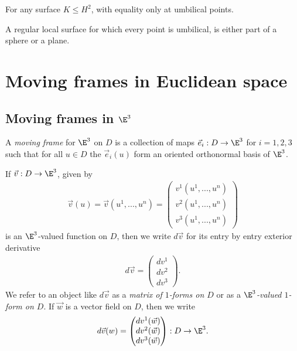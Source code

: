 \documentclass{article}
\begin{document}
\begin{lemma}
    For any surface $K\leq H^2$, with equality only at umbilical points.
\end{lemma}

\begin{theorem}
    A regular local surface for which every point is umbilical, is either part of a sphere 
    or a plane.
\end{theorem}

\section{Moving frames in Euclidean space}

\subsection{Moving frames in $\E^3$}

\begin{definition}
    A \emph{moving frame} for $\E^3$ on $D$ is a collection of maps $\vec e_i:D\to\E^3$
    for $i=1,2,3$ such that for all $u\in D$ the $\vec e_i(u)$ form an oriented orthonormal
    basis of $\E^3$.
\end{definition}

\begin{definition}
    If $\vec v:D\to\E^3$, given by 
    \begin{align*}
        \vec v(u)=\vec v(u^1,...,u^n)=\begin{pmatrix}
            v^1(u^1,...,u^n)\\ 
            v^2(u^1,...,u^n)\\
            v^3(u^1,...,u^n)
        \end{pmatrix}
    \end{align*}
    is an $\E^3$-valued function on $D$, then we write $d\vec v$ for its entry
    by entry exterior derivative 
    \begin{align*}
        d\vec v = \begin{pmatrix}
            dv^1 \\ dv^2 \\ dv^3
        \end{pmatrix}.
    \end{align*}
    We refer to an object like $d\vec v$ as a \emph{matrix of $1$-forms on $D$} or as a 
    \emph{$\E^3$-valued $1$-form on $D$}. If $\vec w$ is a vector field on $D$, then we write
    \begin{align*}
        d\vec v(w) = \begin{pmatrix}
            dv^1(\vec w) \\ dv^2(\vec w) \\ dv^3(\vec w)
        \end{pmatrix} : D\to\E^3.
    \end{align*}
\end{definition}
\end{document}
